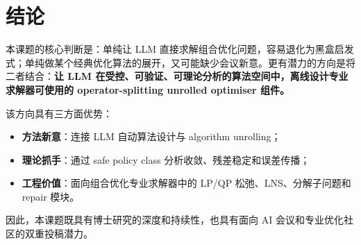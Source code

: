 \documentclass[UTF8,a4paper,12pt,fontset=fandol]{ctexart}
\begin{document}
\section{结论}

本课题的核心判断是：单纯让 LLM 直接求解组合优化问题，容易退化为黑盒启发式；单纯做某个经典优化算法的展开，又可能缺少会议新意。更有潜力的方向是将二者结合：\textbf{让 LLM 在受控、可验证、可理论分析的算法空间中，离线设计专业求解器可使用的 operator-splitting unrolled optimiser 组件。}

该方向具有三方面优势：
\begin{itemize}[leftmargin=2em]
    \item \textbf{方法新意}：连接 LLM 自动算法设计与 algorithm unrolling；
    \item \textbf{理论抓手}：通过 safe policy class 分析收敛、残差稳定和误差传播；
    \item \textbf{工程价值}：面向组合优化专业求解器中的 LP/QP 松弛、LNS、分解子问题和 repair 模块。
\end{itemize}

因此，本课题既具有博士研究的深度和持续性，也具有面向 AI 会议和专业优化社区的双重投稿潜力。
\end{document}
